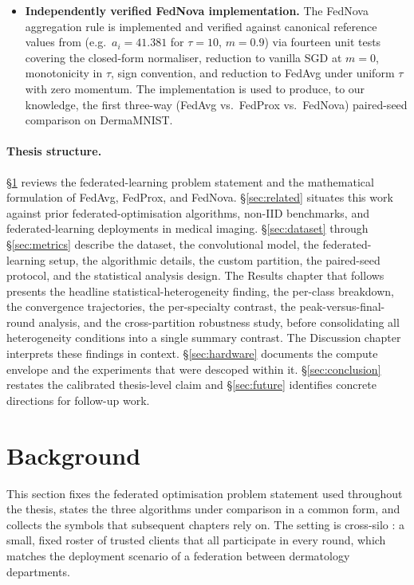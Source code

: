 \documentclass[11pt,a4paper]{article}
\begin{document}
\begin{itemize}
\item \textbf{Independently verified FedNova implementation.} The
FedNova aggregation rule is implemented and verified against
canonical reference values from \citet{wang2020fednova} (e.g.\
$a_i = 41.381$ for $\tau = 10$, $m = 0.9$) via fourteen unit tests
covering the closed-form normaliser, reduction to vanilla SGD at
$m = 0$, monotonicity in $\tau$, sign convention, and reduction to
FedAvg under uniform $\tau$ with zero momentum. The implementation
is used to produce, to our knowledge, the first three-way
(FedAvg vs.\ FedProx vs.\ FedNova) paired-seed comparison on
DermaMNIST.
\end{itemize}

\paragraph{Thesis structure.} \S\ref{sec:background} reviews the
federated-learning problem statement and the mathematical formulation
of FedAvg, FedProx, and FedNova. \S\ref{sec:related} situates this
work against prior federated-optimisation algorithms, non-IID
benchmarks, and federated-learning deployments in medical imaging.
\S\ref{sec:dataset} through \S\ref{sec:metrics} describe the dataset,
the convolutional model, the federated-learning setup, the
algorithmic details, the custom partition, the paired-seed protocol,
and the statistical analysis design. The Results chapter that follows
presents the headline statistical-heterogeneity finding, the
per-class breakdown, the convergence trajectories, the per-specialty
contrast, the peak-versus-final-round analysis, and the
cross-partition robustness study, before consolidating all
heterogeneity conditions into a single summary contrast.  The
Discussion chapter interprets these findings in context.
\S\ref{sec:hardware} documents the compute envelope and the
experiments that were descoped within it. \S\ref{sec:conclusion}
restates the calibrated thesis-level claim and \S\ref{sec:future}
identifies concrete directions for follow-up work.

\section{Background}\label{sec:background}
This section fixes the federated optimisation problem statement used
throughout the thesis, states the three algorithms under comparison in a
common form, and collects the symbols that subsequent chapters rely on. The
setting is cross-silo \citep{kairouz2021advances}: a small, fixed roster of
trusted clients that all participate in every round, which matches the
deployment scenario of a federation between dermatology departments.
\end{document}
